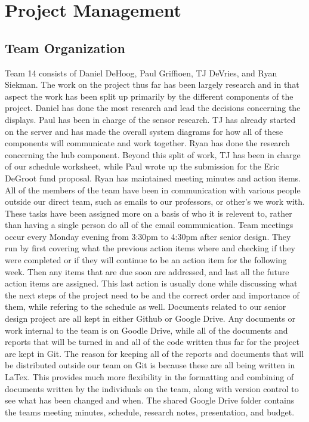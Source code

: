 \documentclass[ppfs.tex]{template/subfiles}
\begin{document}
\section{Project Management}
    \subsection{Team Organization}
	Team 14 consists of Daniel DeHoog, Paul Griffioen, TJ DeVries, and Ryan Siekman. The work on the project thus far has been largely research and in that aspect the work has been split up primarily by the different components of the project. Daniel has done the most research and lead the decisions concerning the displays. Paul has been in charge of the sensor research. TJ has already started on the server and has made the overall system diagrams for how all of these components will communicate and work together. Ryan has done the research concerning the hub component. Beyond this split of work, TJ has been in charge of our schedule worksheet, while Paul wrote up the submission for the Eric DeGroot fund proposal. Ryan has maintained meeting minutes and action items. All of the members of the team have been in communication with various people outside our direct team, such as emails to our professors, or other's we work with. These tasks have been assigned more on a basis of who it is relevent to, rather than having a single person do all of the email communication. 
	Team meetings occur every Monday evening from 3:30pm to 4:30pm after senior design. They run by first covering what the previous action items where and checking if they were completed or if they will continue to be an action item for the following week. Then any items that are due soon are addressed, and last all the future action items are assigned. This last action is usually done while discussing what the next steps of the project need to be and the correct order and importance of them, while refering to the schedule as well.
	Documents related to our senior design project are all kept in either Github or Google Drive. Any documents or work internal to the team is on Goodle Drive, while all of the documents and reports that will be turned in and all of the code written thus far for the project are kept in Git. The reason for keeping all of the reports and documents that will be distributed outside our team on Git is because these are all being written in LaTex. This provides much more flexibility in the formatting and combining of documents written by the individuals on the team, along with version control to see what has been changed and when. The shared Google Drive folder contains the teams meeting minutes, schedule, research notes, presentation, and budget.
	
\end{document}
